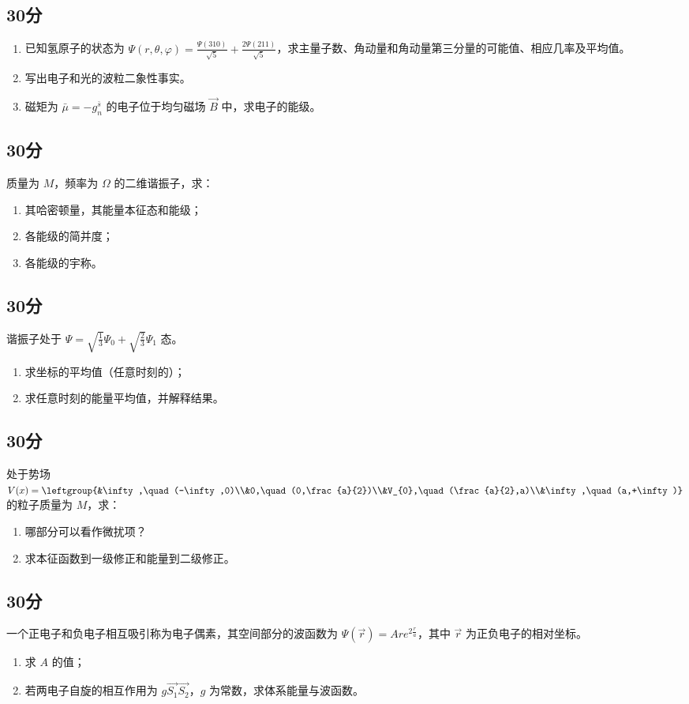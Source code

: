 
\subsection{30分}
\begin{enumerate}
\item 已知氢原子的状态为 $\varPsi (r,\theta,\varphi)=\frac{\varPsi (310)}{\sqrt{5}}+\frac{2\varPsi (211)}{\sqrt{5}}$，求主量子数、角动量和角动量第三分量的可能值、相应几率及平均值。
\item 写出电子和光的波粒二象性事实。
\item 磁矩为 $\bar{\mu}=-g^{\bar{s}}_{n}$ 的电子位于均匀磁场 $\vec{B}$ 中，求电子的能级。
\end{enumerate}
\subsection{30分}
质量为 $M$，频率为 $\Omega$ 的二维谐振子，求：
\begin{enumerate}
\item 其哈密顿量，其能量本征态和能级；
\item 各能级的简并度；
\item 各能级的宇称。
\end{enumerate}
\subsection{30分}
谐振子处于 $\varPsi =\sqrt{\frac{1}{3}}\varPsi_{0}+\sqrt{\frac{2}{3}}\varPsi_{1}$ 态。
\begin{enumerate}
\item 求坐标的平均值（任意时刻的）；
\item 求任意时刻的能量平均值，并解释结果。
\end{enumerate}
\subsection{30分}
处于势场 $V(x)=\leftgroup{&\infty,\quad (-\infty,0)\\&0,\quad (0,\frac{a}{2})\\&V_{0},\quad (\frac{a}{2},a)\\&\infty,\quad (a,+\infty)}$ 的粒子质量为 $M$，求：
\begin{enumerate}
\item 哪部分可以看作微扰项？
\item 求本征函数到一级修正和能量到二级修正。
\end{enumerate}
\subsection{30分}
一个正电子和负电子相互吸引称为电子偶素，其空间部分的波函数为 $\varPsi (\vec{r})=Are^{2\frac{r}{a}}$，其中 $\vec{r}$ 为正负电子的相对坐标。
\begin{enumerate}
\item 求 $A$ 的值；
\item 若两电子自旋的相互作用为 $g\vec{S_{1}}\vec{S_{2}}$，$g$ 为常数，求体系能量与波函数。
\end{enumerate}